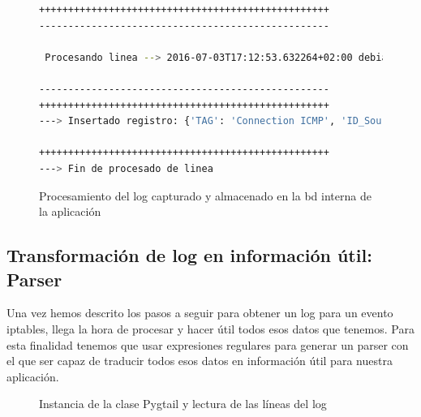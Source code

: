 \begin{figure}[H]
\begin{lstlisting}[language=bash, breaklines=true]
++++++++++++++++++++++++++++++++++++++++++++++++++
--------------------------------------------------

 Procesando linea --> 2016-07-03T17:12:53.632264+02:00 debian kernel: [23896.003739] IPTMSG=Connection ICMP IN=lo OUT= MAC=00:00:00:00:00:00:00:00:00:00:00:00:08:00 SRC=127.0.0.1 DST=127.0.0.1 LEN=84 TOS=0x00 PREC=0x00 TTL=64 ID=64157 DF PROTO=ICMP TYPE=8 CODE=0 ID=14177 SEQ=7

--------------------------------------------------
++++++++++++++++++++++++++++++++++++++++++++++++++
---> Insertado registro: {'TAG': 'Connection ICMP', 'ID_Source_PORT': None, 'Protocol': u'ICMP', 'RAW_Info': '2016-07-03T17:12:53.632264+02:00 debian kernel 23896.003739 IPTMSG=Connection ICMP IN=lo OUT MAC=00:00:00:00:00:00:00:00:00:00:00:00:08:00 SRC=127.0.0.1 DST=127.0.0.1 LEN=84 TOS=0x00 PREC=0x00 TTL=64 ID=64157 DF PROTO=ICMP TYPE=8 CODE=0 ID=14177 SEQ=7 ', 'ID_Source_MAC': <Macs: 00:00:00:00:00:00:00:00:00:00:00:00:08:00>, 'ID_Source_IP': <Ips: 127.0.0.1>, 'ID_Dest_IP': <Ips: 127.0.0.1>, 'ID_Dest_PORT': None, 'ID_Dest_MAC': <Macs: 00:00:00:00:00:00:00:00:00:00:00:00:08:00>}

++++++++++++++++++++++++++++++++++++++++++++++++++
---> Fin de procesado de linea
\end{lstlisting}
\caption{Procesamiento del log capturado y almacenado en la bd interna de la aplicación}
\end{figure}
\pagebreak

\subsection[Parser]{Transformación de log en información útil: Parser}

Una vez hemos descrito los pasos a seguir para obtener un log para un evento iptables, llega la hora de procesar y hacer útil todos esos datos que tenemos. Para esta finalidad tenemos que usar expresiones regulares para generar un parser con el que ser capaz de traducir todos esos datos en información útil para nuestra aplicación.\\

\begin{figure}[H]

\caption{Instancia de la clase Pygtail y lectura de las líneas del log}
\end{figure}

